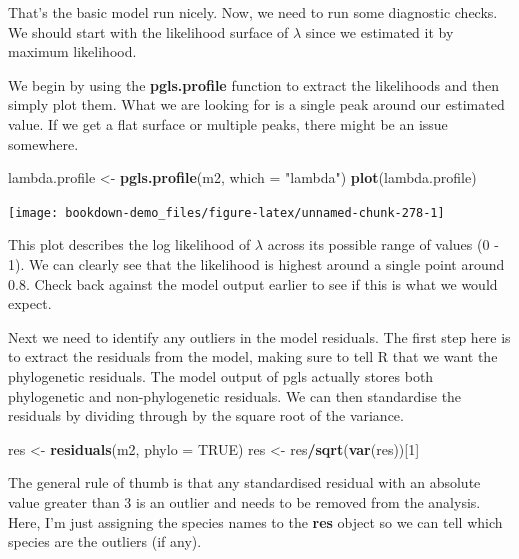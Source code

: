 \documentclass[
]{book}
\newenvironment{Shaded}{\begin{snugshade}}{\end{snugshade}}
\newcommand{\DataTypeTok}[1]{\textcolor[rgb]{0.13,0.29,0.53}{#1}}
\newcommand{\DecValTok}[1]{\textcolor[rgb]{0.00,0.00,0.81}{#1}}
\newcommand{\KeywordTok}[1]{\textcolor[rgb]{0.13,0.29,0.53}{\textbf{#1}}}
\newcommand{\NormalTok}[1]{#1}
\newcommand{\OperatorTok}[1]{\textcolor[rgb]{0.81,0.36,0.00}{\textbf{#1}}}
\newcommand{\OtherTok}[1]{\textcolor[rgb]{0.56,0.35,0.01}{#1}}
\newcommand{\StringTok}[1]{\textcolor[rgb]{0.31,0.60,0.02}{#1}}
\begin{document}
That's the basic model run nicely. Now, we need to run some diagnostic checks. We should start with the likelihood surface of \(\lambda\) since we estimated it by maximum likelihood.

We begin by using the \textbf{pgls.profile} function to extract the likelihoods and then simply plot them. What we are looking for is a single peak around our estimated value. If we get a flat surface or multiple peaks, there might be an issue somewhere.

\begin{Shaded}
\begin{Highlighting}[]
\NormalTok{lambda.profile \textless{}{-}}\StringTok{ }\KeywordTok{pgls.profile}\NormalTok{(m2, }\DataTypeTok{which =} \StringTok{"lambda"}\NormalTok{)}
\KeywordTok{plot}\NormalTok{(lambda.profile)}
\end{Highlighting}
\end{Shaded}

\begin{center}\texttt{[image: bookdown-demo\_files/figure-latex/unnamed-chunk-278-1]} \end{center}

This plot describes the log likelihood of \(\lambda\) across its possible range of values (0 - 1). We can clearly see that the likelihood is highest around a single point around 0.8. Check back against the model output earlier to see if this is what we would expect.

Next we need to identify any outliers in the model residuals. The first step here is to extract the residuals from the model, making sure to tell R that we want the phylogenetic residuals. The model output of pgls actually stores both phylogenetic and non-phylogenetic residuals. We can then standardise the residuals by dividing through by the square root of the variance.

\begin{Shaded}
\begin{Highlighting}[]
\NormalTok{res \textless{}{-}}\StringTok{ }\KeywordTok{residuals}\NormalTok{(m2, }\DataTypeTok{phylo =} \OtherTok{TRUE}\NormalTok{)}
\NormalTok{res \textless{}{-}}\StringTok{ }\NormalTok{res}\OperatorTok{/}\KeywordTok{sqrt}\NormalTok{(}\KeywordTok{var}\NormalTok{(res))[}\DecValTok{1}\NormalTok{]}
\end{Highlighting}
\end{Shaded}

The general rule of thumb is that any standardised residual with an absolute value greater than 3 is an outlier and needs to be removed from the analysis. Here, I'm just assigning the species names to the \textbf{res} object so we can tell which species are the outliers (if any).
\end{document}
